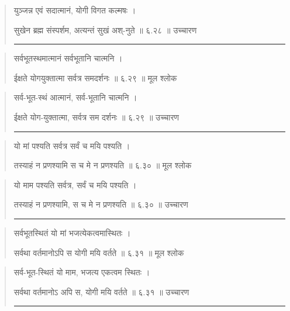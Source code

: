 \begin{quotation}

युञ्जन्न एवं सदात्मानं, योगी विगत कल्मषः  ।  

सुखेन ब्रह्म संस्पर्शम, अत्यन्तं सुखं अश्-नुते  ॥ ६.२८ ॥  उच्चारण

\noindent\rule{16cm}{0.4pt} 
\end{quotation}


\begin{quotation}  

सर्वभूतस्थमात्मानं सर्वभूतानि चात्मनि  ।  

ईक्षते योगयुक्तात्मा सर्वत्र समदर्शनः  ॥ ६.२९ ॥  मूल श्लोक
\end{quotation}

\begin{quotation}

सर्व-भूत-स्थं आत्मानं, सर्व-भूतानि चात्मनि  ।  

ईक्षते योग-युक्तात्मा, सर्वत्र सम दर्शनः  ॥ ६.२९ ॥  उच्चारण

\noindent\rule{16cm}{0.4pt} 
\end{quotation}


\begin{quotation}  
यो मां पश्यति सर्वत्र सर्वं च मयि पश्यति  ।  

तस्याहं न प्रणश्यामि स च मे न प्रणश्यति  ॥ ६.३० ॥  मूल श्लोक
\end{quotation}

\begin{quotation}

यो माम पश्यति सर्वत्र, सर्वं च मयि पश्यति  ।  

तस्याहं न प्रणश्यामि, स च मे न प्रणश्यति  ॥ ६.३० ॥  उच्चारण

\noindent\rule{16cm}{0.4pt} 
\end{quotation}


\begin{quotation}  

सर्वभूतस्थितं यो मां भजत्येकत्वमास्थितः  ।  

सर्वथा वर्तमानोऽपि स योगी मयि वर्तते  ॥ ६.३१ ॥  मूल श्लोक
\end{quotation}

\begin{quotation}

सर्व-भूत-स्थितं यो माम, भजत्य एकत्वम स्थितः  ।  

सर्वथा वर्तमानोऽ अपि स, योगी मयि वर्तते  ॥ ६.३१ ॥  उच्चारण

\noindent\rule{16cm}{0.4pt} 
\end{quotation}


